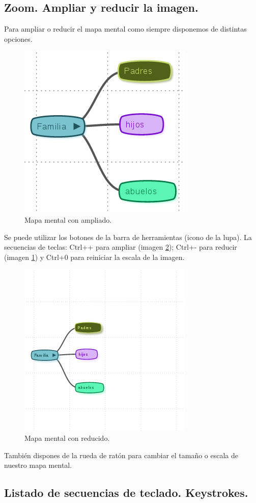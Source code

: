 \subsection{Zoom. Ampliar y reducir la imagen.}

Para ampliar o reducir el mapa mental como siempre disponemos de distintas opciones. 

\begin{figure}[tbph]
\centering
\includegraphics[width=0.3\linewidth]{imagenes/MM-zoom-in.png}
\caption{Mapa mental con ampliado.}
\label{fig:MM-zoom-in}
\end{figure}

Se puede utilizar los botones de la barra de herramientas (icono de la lupa). La secuencias de teclas: Ctrl++ para ampliar (imagen \ref{fig:MM-zoom-out}); Ctrl+- para reducir (imagen \ref{fig:MM-zoom-in}) y Ctrl+0 para reiniciar la escala de la imagen.  

\begin{figure}[tbph]
\centering
\includegraphics[width=0.3\linewidth]{imagenes/MM-zoom-out.png}
\caption{Mapa mental con reducido.}
\label{fig:MM-zoom-out}
\end{figure}

También dispones de la rueda de ratón para cambiar el tamaño o escala de nuestro mapa mental. 

\subsection{Listado de secuencias de teclado. Keystrokes.}

